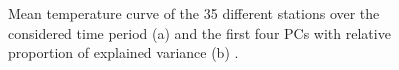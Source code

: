 \begin{figure}
    \centering
    \qquad
    \caption[Functional Principal Component Analysis.]{Mean temperature curve of the 35 different stations over the considered time period (a) and the first four PCs with relative proportion of explained variance (b) \cite{ramsay_functional_2006, ramsay_functional_2009}.}
    \label{fig:FPCA}
\end{figure}
